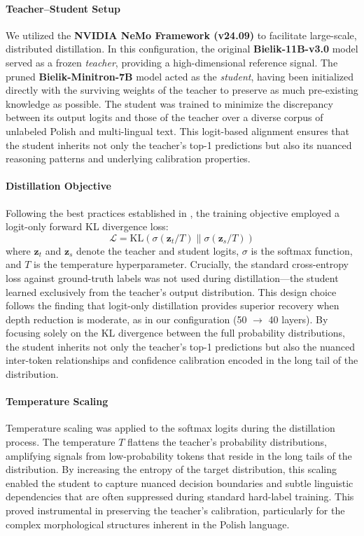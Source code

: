 \documentclass{article}
\begin{document}
\paragraph{Teacher--Student Setup}
We utilized the \textbf{NVIDIA NeMo Framework (v24.09)} to facilitate large-scale, distributed distillation. In this configuration, the original \textbf{Bielik-11B-v3.0} model served as a frozen \emph{teacher}, providing a high-dimensional reference signal. The pruned \textbf{Bielik-Minitron-7B} model acted as the \emph{student}, having been initialized directly with the surviving weights of the teacher to preserve as much pre-existing knowledge as possible. The student was trained to minimize the discrepancy between its output logits and those of the teacher over a diverse corpus of unlabeled Polish and multi-lingual text. This logit-based alignment ensures that the student inherits not only the teacher's top-1 predictions but also its nuanced reasoning patterns and underlying calibration properties.

\paragraph{Distillation Objective}
Following the best practices established in \cite{muralidharan2024compact}, the training objective employed a logit-only forward KL divergence loss:
\begin{equation}
    \mathcal{L} = \text{KL}\left(\sigma(\mathbf{z}_t/T) \| \sigma(\mathbf{z}_s/T)\right)
\end{equation}
where $\mathbf{z}_t$ and $\mathbf{z}_s$ denote the teacher and student logits, $\sigma$ is the softmax function, and $T$ is the temperature hyperparameter. Crucially, the standard cross-entropy loss against ground-truth labels was not used during distillation---the student learned exclusively from the teacher's output distribution. This design choice follows the finding that logit-only distillation provides superior recovery when depth reduction is moderate, as in our configuration (50 $\rightarrow$ 40 layers). By focusing solely on the KL divergence between the full probability distributions, the student inherits not only the teacher's top-1 predictions but also the nuanced inter-token relationships and confidence calibration encoded in the long tail of the distribution.

\paragraph{Temperature Scaling}
Temperature scaling was applied to the softmax logits during the distillation process. The temperature $T$ flattens the teacher's probability distributions, amplifying signals from low-probability tokens that reside in the long tails of the distribution. By increasing the entropy of the target distribution, this scaling enabled the student to capture nuanced decision boundaries and subtle linguistic dependencies that are often suppressed during standard hard-label training. This proved instrumental in preserving the teacher's calibration, particularly for the complex morphological structures inherent in the Polish language.
\end{document}
